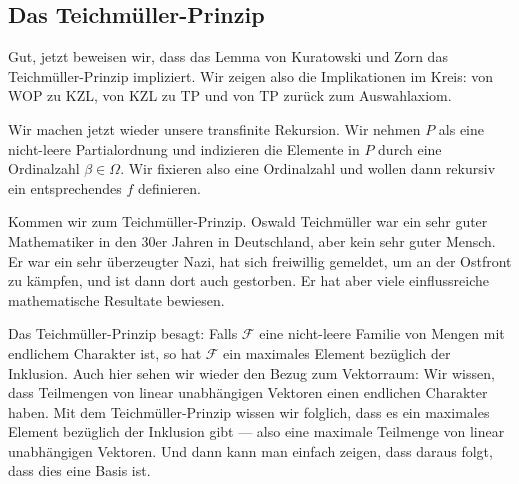\subsection{Das Teichmüller-Prinzip}

\begin{spoken-clean}[00:56:45 - 00:58:30]
Gut, jetzt beweisen wir, dass das Lemma von Kuratowski und Zorn das Teichmüller-Prinzip impliziert. Wir zeigen also die Implikationen im Kreis: von WOP zu KZL, von KZL zu TP und von TP zurück zum Auswahlaxiom.

Wir machen jetzt wieder unsere transfinite Rekursion. Wir nehmen $P$ als eine nicht-leere Partialordnung und indizieren die Elemente in $P$ durch eine Ordinalzahl $\beta \in \Omega$. Wir fixieren also eine Ordinalzahl und wollen dann rekursiv ein entsprechendes $f$ definieren.
\end{spoken-clean}

\begin{math-stroke}

\end{math-stroke}

\begin{spoken-clean}[00:58:30 - 01:00:30]
Kommen wir zum Teichmüller-Prinzip. Oswald Teichmüller war ein sehr guter Mathematiker in den 30er Jahren in Deutschland, aber kein sehr guter Mensch. Er war ein sehr überzeugter Nazi, hat sich freiwillig gemeldet, um an der Ostfront zu kämpfen, und ist dann dort auch gestorben. Er hat aber viele einflussreiche mathematische Resultate bewiesen.

Das Teichmüller-Prinzip besagt: Falls $\mathcal{F}$ eine nicht-leere Familie von Mengen mit endlichem Charakter ist, so hat $\mathcal{F}$ ein maximales Element bezüglich der Inklusion. Auch hier sehen wir wieder den Bezug zum Vektorraum: Wir wissen, dass Teilmengen von linear unabhängigen Vektoren einen endlichen Charakter haben. Mit dem Teichmüller-Prinzip wissen wir folglich, dass es ein maximales Element bezüglich der Inklusion gibt --- also eine maximale Teilmenge von linear unabhängigen Vektoren. Und dann kann man einfach zeigen, dass daraus folgt, dass dies eine Basis ist.
\end{spoken-clean}

